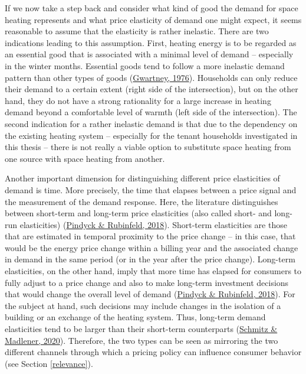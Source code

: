 \documentclass[12pt,twoside]{reedthesis}
\begin{document}
If we now take a step back and consider what kind of good the demand for space heating represents and what price elasticity of demand one might expect, it seems reasonable to assume that the elasticity is rather inelastic. There are two indications leading to this assumption. First, heating energy is to be regarded as an essential good that is associated with a minimal level of demand -- especially in the winter months. Essential goods tend to follow a more inelastic demand pattern than other types of goods (\protect\hyperlink{ref-gwartney76}{Gwartney, 1976}). Households can only reduce their demand to a certain extent (right side of the intersection), but on the other hand, they do not have a strong rationality for a large increase in heating demand beyond a comfortable level of warmth (left side of the intersection). The second indication for a rather inelastic demand is that due to the dependency on the existing heating system -- especially for the tenant households investigated in this thesis -- there is not really a viable option to substitute space heating from one source with space heating from another.

Another important dimension for distinguishing different price elasticities of demand is time. More precisely, the time that elapses between a price signal and the measurement of the demand response. Here, the literature distinguishes between short-term and long-term price elasticities (also called short- and long-run elasticities) (\protect\hyperlink{ref-pindyck_rubinfeld18}{Pindyck \& Rubinfeld, 2018}). Short-term elasticities are those that are estimated in temporal proximity to the price change -- in this case, that would be the energy price change within a billing year and the associated change in demand in the same period (or in the year after the price change). Long-term elasticities, on the other hand, imply that more time has elapsed for consumers to fully adjust to a price change and also to make long-term investment decisions that would change the overall level of demand (\protect\hyperlink{ref-pindyck_rubinfeld18}{Pindyck \& Rubinfeld, 2018}). For the subject at hand, such decisions may include changes in the isolation of a building or an exchange of the heating system. Thus, long-term demand elasticities tend to be larger than their short-term counterparts (\protect\hyperlink{ref-schmitz_madlener20}{Schmitz \& Madlener, 2020}). Therefore, the two types can be seen as mirroring the two different channels through which a pricing policy can influence consumer behavior (see Section \ref{relevance}).
\end{document}
